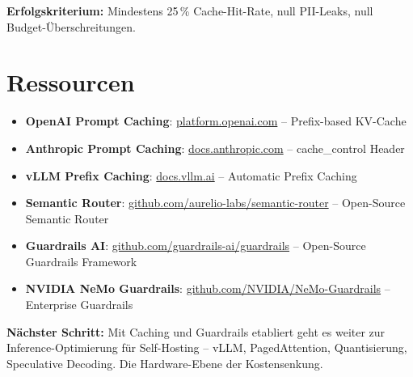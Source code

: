 \textbf{Erfolgskriterium:} Mindestens 25\,\% Cache-Hit-Rate, null PII-Leaks, null Budget-Überschreitungen.

\section{Ressourcen}

\begin{itemize}[leftmargin=*]
    \item \textbf{OpenAI Prompt Caching}: \href{https://platform.openai.com/docs/guides/prompt-caching}{platform.openai.com} -- Prefix-based KV-Cache
    \item \textbf{Anthropic Prompt Caching}: \href{https://docs.anthropic.com/en/docs/build-with-claude/prompt-caching}{docs.anthropic.com} -- cache\_control Header
    \item \textbf{vLLM Prefix Caching}: \href{https://docs.vllm.ai/en/latest/features/automatic_prefix_caching.html}{docs.vllm.ai} -- Automatic Prefix Caching
    \item \textbf{Semantic Router}: \href{https://github.com/aurelio-labs/semantic-router}{github.com/aurelio-labs/semantic-router} -- Open-Source Semantic Router
    \item \textbf{Guardrails AI}: \href{https://github.com/guardrails-ai/guardrails}{github.com/guardrails-ai/guardrails} -- Open-Source Guardrails Framework
    \item \textbf{NVIDIA NeMo Guardrails}: \href{https://github.com/NVIDIA/NeMo-Guardrails}{github.com/NVIDIA/NeMo-Guardrails} -- Enterprise Guardrails
\end{itemize}

\textbf{Nächster Schritt:} Mit Caching und Guardrails etabliert geht es weiter zur Inference-Optimierung für Self-Hosting -- vLLM, PagedAttention, Quantisierung, Speculative Decoding. Die Hardware-Ebene der Kostensenkung.
\endinput

\clearpage
